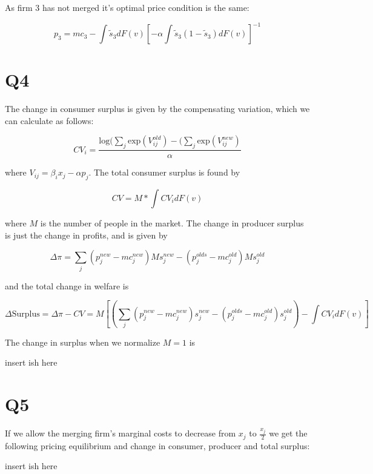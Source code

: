 \documentclass{article}
\newcommand{\1}{\mathbbm{1}}
\begin{document}
As firm 3 has not merged it's optimal price condition is the same:

$$p_3 = mc_3 - \int \tilde{s}_3 dF(v)[ -\alpha \int \tilde{s}_3(1-\tilde{s}_3)dF(v)]^{-1}$$


\section{Q4}
The change in consumer surplus is given by the compensating variation, which we can calculate as follows:

$$CV_i = \frac{\text{log}(\sum_j \text{exp}(V_{ij}^{old}) - (\sum_j \text{exp}(V_{ij}^{new})}{\alpha}$$

where $V_{ij} = \beta_ix_j - \alpha p_j$. The total consumer surplus is found by 

$$CV = M*\int CV_i dF(v)$$

where $M$ is the number of people in the market. The change in producer surplus is just the change in profits, and is given by 

$$\Delta \pi = \sum_j (p_j^{new} - mc_j^{new})Ms_j^{new} - (p_j^{olds} - mc_j^{old})Ms_j^{old}$$

and the total change in welfare is 

$$\Delta \text{Surplus} = \Delta \pi - CV = M[(\sum_j (p_j^{new} - mc_j^{new})s_j^{new} - (p_j^{olds} - mc_j^{old})s_j^{old}) - \int CV_i dF(v)] $$

The change in surplus when we normalize $M = 1$ is 

\color{red}
insert ish here
\color{black}

\section{Q5}
If we allow the merging firm's marginal costs to decrease from $x_j$ to $\frac{x_j}{2}$ we get the following pricing equilibrium and change in consumer, producer and total surplus:

\color{red}
insert ish here
\color{black}
\end{document}
